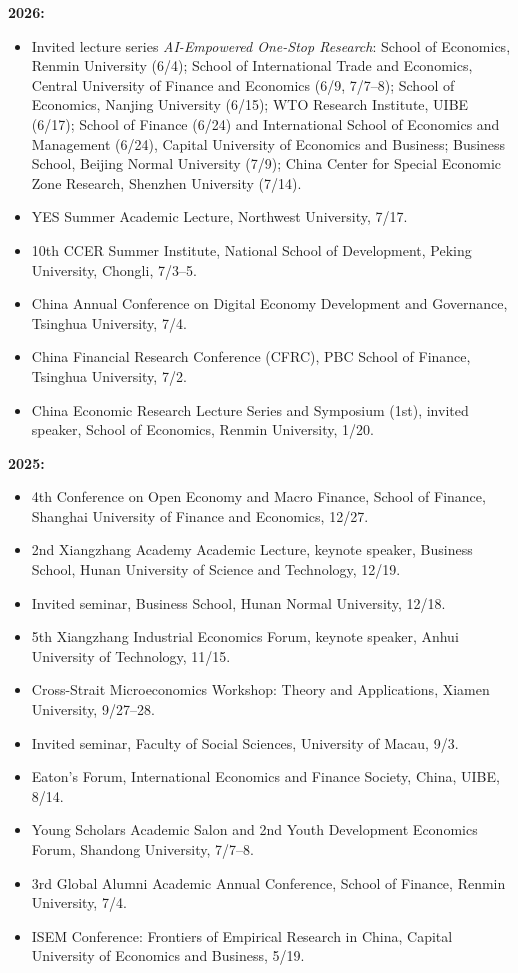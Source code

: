 \documentclass[letterpaper]{article}
\begin{document}
\vspace{0.6em}
\textbf{2026:}
\begin{itemize}[leftmargin=1.6em, itemsep=0.25em, topsep=0.2em]
  \item Invited lecture series \textit{AI-Empowered One-Stop Research}: School of Economics, Renmin University (6/4); School of International Trade and Economics, Central University of Finance and Economics (6/9, 7/7--8); School of Economics, Nanjing University (6/15); WTO Research Institute, UIBE (6/17); School of Finance (6/24) and International School of Economics and Management (6/24), Capital University of Economics and Business; Business School, Beijing Normal University (7/9); China Center for Special Economic Zone Research, Shenzhen University (7/14).
  \item YES Summer Academic Lecture, Northwest University, 7/17.
  \item 10th CCER Summer Institute, National School of Development, Peking University, Chongli, 7/3--5.
  \item China Annual Conference on Digital Economy Development and Governance, Tsinghua University, 7/4.
  \item China Financial Research Conference (CFRC), PBC School of Finance, Tsinghua University, 7/2.
  \item China Economic Research Lecture Series and Symposium (1st), invited speaker, School of Economics, Renmin University, 1/20.
\end{itemize}

\textbf{2025:}
\begin{itemize}[leftmargin=1.6em, itemsep=0.25em, topsep=0.2em]
  \item 4th Conference on Open Economy and Macro Finance, School of Finance, Shanghai University of Finance and Economics, 12/27.
  \item 2nd Xiangzhang Academy Academic Lecture, keynote speaker, Business School, Hunan University of Science and Technology, 12/19.
  \item Invited seminar, Business School, Hunan Normal University, 12/18.
  \item 5th Xiangzhang Industrial Economics Forum, keynote speaker, Anhui University of Technology, 11/15.
  \item Cross-Strait Microeconomics Workshop: Theory and Applications, Xiamen University, 9/27--28.
  \item Invited seminar, Faculty of Social Sciences, University of Macau, 9/3.
  \item Eaton's Forum, International Economics and Finance Society, China, UIBE, 8/14.
  \item Young Scholars Academic Salon and 2nd Youth Development Economics Forum, Shandong University, 7/7--8.
  \item 3rd Global Alumni Academic Annual Conference, School of Finance, Renmin University, 7/4.
  \item ISEM Conference: Frontiers of Empirical Research in China, Capital University of Economics and Business, 5/19.
\end{itemize}
\end{document}
